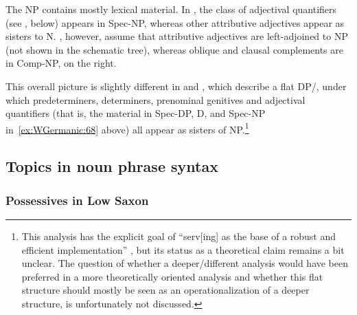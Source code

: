 \documentclass[output=paper,hidelinks]{langscibook}
\begin{document}
The NP contains mostly lexical material. In \citet[Chapter~7, the
  theoretical discussion]{dipper03}, the class of adjectival
quantifiers (see , below) appears in Spec-NP,
whereas other attributive adjectives appear as sisters to
N. \citet{berman-frank:1996}, however, assume that attributive
adjectives are left-adjoined to NP (not shown in the schematic tree),
whereas oblique and clausal complements are in Comp-NP, on the right.

This overall picture is slightly different in \citet[Chapter~8, the
  computational implementation]{dipper03} and  \citet{Dipper05}, which describe a flat DP/, under which
predeterminers, determiners, prenominal genitives and adjectival
quantifiers (that is, the material in Spec-DP, D, and Spec-NP
in~\ref{ex:WGermanic:68} above) all appear as sisters of NP.\footnote{This
analysis has the explicit goal of ``serv[ing] as the base of a robust
and efficient implementation'' \citep[101]{Dipper05}, but its
status as a theoretical claim remains a bit unclear. The question of
whether a deeper/different analysis would have been preferred in a
more theoretically oriented analysis and whether this flat structure
should mostly be seen as an operationalization of a deeper structure,
is unfortunately not discussed.}

\subsection{Topics in noun phrase syntax}

\subsubsection{Possessives in Low Saxon\label{sec:Germanic:posslowsax}}
\end{document}
